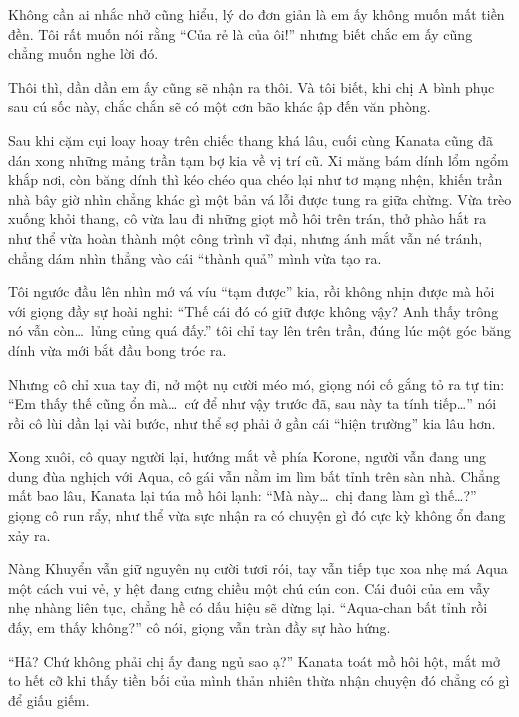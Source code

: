 \documentclass[../main.tex]{subfiles}
\begin{document}

Không cần ai nhắc nhở cũng hiểu, lý do đơn giản là em ấy không muốn mất tiền đền. Tôi rất muốn nói rằng ``Của rẻ là của ôi!'' nhưng biết chắc em ấy cũng chẳng muốn nghe lời đó.

Thôi thì, dần dần em ấy cũng sẽ nhận ra thôi. Và tôi biết, khi chị A bình phục sau cú sốc này, chắc chắn sẽ có một cơn bão khác ập đến văn phòng.

\ct

Sau khi cặm cụi loay hoay trên chiếc thang khá lâu, cuối cùng Kanata cũng đã dán xong những mảng trần tạm bợ kia về vị trí cũ. Xi măng bám dính lổm ngổm khắp nơi, còn băng dính thì kéo chéo qua chéo lại như tơ mạng nhện, khiến trần nhà bây giờ nhìn chẳng khác gì một bản vá lỗi được tung ra giữa chừng. Vừa trèo xuống khỏi thang, cô vừa lau đi những giọt mồ hôi trên trán, thở phào hắt ra như thể vừa hoàn thành một công trình vĩ đại, nhưng ánh mắt vẫn né tránh, chẳng dám nhìn thẳng vào cái ``thành quả'' mình vừa tạo ra.

Tôi ngước đầu lên nhìn mớ vá víu ``tạm được'' kia, rồi không nhịn được mà hỏi với giọng đầy sự hoài nghi: ``Thế cái đó có giữ được không vậy? Anh thấy trông nó vẫn còn\dots\ lủng củng quá đấy.'' tôi chỉ tay lên trên trần, đúng lúc một góc băng dính vừa mới bắt đầu bong tróc ra.

Nhưng cô chỉ xua tay đi, nở một nụ cười méo mó, giọng nói cố gắng tỏ ra tự tin: ``Em thấy thế cũng ổn mà\dots\ cứ để như vậy trước đã, sau này ta tính tiếp\dots'' nói rồi cô lùi dần lại vài bước, như thể sợ phải ở gần cái ``hiện trường'' kia lâu hơn.

Xong xuôi, cô quay người lại, hướng mắt về phía Korone, người vẫn đang ung dung đùa nghịch với Aqua, cô gái vẫn nằm im lìm bất tỉnh trên sàn nhà. Chẳng mất bao lâu, Kanata lại túa mồ hôi lạnh: ``Mà này\dots\ chị đang làm gì thế\dots?'' giọng cô run rẩy, như thể vừa sực nhận ra có chuyện gì đó cực kỳ không ổn đang xảy ra.

Nàng Khuyển vẫn giữ nguyên nụ cười tươi rói, tay vẫn tiếp tục xoa nhẹ má Aqua một cách vui vẻ, y hệt đang cưng chiều một chú cún con. Cái đuôi của em vẫy nhẹ nhàng liên tục, chẳng hề có dấu hiệu sẽ dừng lại. ``Aqua-chan bất tỉnh rồi đấy, em thấy không?'' cô nói, giọng vẫn tràn đầy sự hào hứng.


``Hả? Chứ không phải chị ấy đang ngủ sao ạ?'' Kanata toát mồ hôi hột, mắt mở to hết cỡ khi thấy tiền bối của mình thản nhiên thừa nhận chuyện đó chẳng có gì để giấu giếm.
\end{document}
